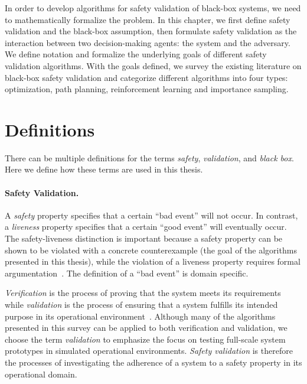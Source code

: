 In order to develop algorithms for safety validation of black-box systems, we need to mathematically formalize the problem. In this chapter, we first define safety validation and the black-box assumption, then formulate safety validation as the interaction between two decision-making agents: the system and the adversary. We define notation and formalize the underlying goals of different safety validation algorithms. With the goals defined, we survey the existing literature on black-box safety validation and categorize different algorithms into four types: optimization, path planning, reinforcement learning and importance sampling. 

\section{Definitions}
There can be multiple definitions for the terms \emph{safety}, \emph{validation}, and \emph{black box}. Here we define how these terms are used in this thesis.

\paragraph{Safety Validation.}
A \emph{safety} property specifies that a certain ``bad event'' will not occur. In contrast, a \emph{liveness} property specifies that a certain ``good event'' will eventually occur. The safety-liveness distinction is important because a safety property can be shown to be violated with a concrete counterexample (the goal of the algorithms presented in this thesis), while the violation of a liveness property requires formal argumentation~\cite{alpern1987recognizing}. The definition of a ``bad event'' is domain specific. 

\emph{Verification} is the process of proving that the system meets its requirements while \emph{validation} is the process of ensuring that a system fulfills its intended purpose in its operational environment~\cite{hirshorn2017nasa}. Although many of the algorithms presented in this survey can be applied to both verification and validation, we choose the term \emph{validation} to emphasize the focus on testing full-scale system prototypes in simulated operational environments. \emph{Safety validation} is therefore the processes of investigating the adherence of a system to a safety property in its operational domain.


